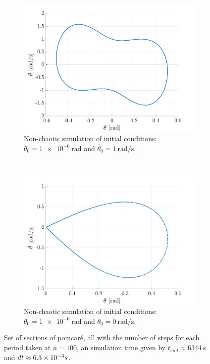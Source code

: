 \documentclass[a4paper,12pt,twoside]{article}
\begin{document}
\begin{figure}[h]
	\newline
	\begin{subfigure}[t]{0.45\textwidth}
		\includegraphics[width=\textwidth]{graphs/e_poincare_peanut.png}
		\caption{Non-chaotic simulation of initial conditions: $\theta_0 = \SI{1e-6}{\radian}$ and $\dot{\theta_0}=\SI{1}{\radian\per\s}$.}
		\label{fig:e-pc-peanut}
	\end{subfigure}
	~
	\begin{subfigure}[t]{0.45\textwidth}
		\includegraphics[width=\textwidth]{graphs/e_poincare_drop.png}
		\caption{Non-chaotic simulation of initial conditions: $\theta_0 = \SI{1e-6}{\radian}$ and $\dot{\theta_0}=\SI{0}{\radian\per\s}$.}
		\label{fig:e-pc-drop}
	\end{subfigure}
	\caption{Set of sections of poincaré, all with the number of steps for each period taken at $n=100$, an simulation time given by $t_{end} \approx \SI{6344}{\s}$ and $dt \approx \num{6.3d-3} s$.}
	\label{fig:e-pc}
\end{figure}
\end{document}
